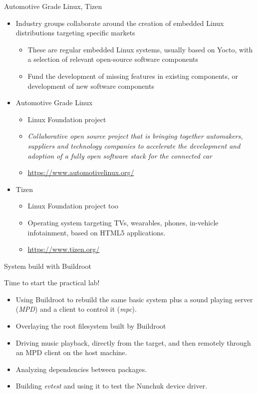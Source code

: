 \begin{frame}{Automotive Grade Linux, Tizen}
  \begin{itemize}
  \item Industry groups collaborate around the creation of embedded
    Linux distributions targeting specific markets
    \begin{itemize}
    \item These are regular embedded Linux systems, usually based on
      Yocto, with a selection of relevant open-source software components
    \item Fund the development of missing features in existing
      components, or development of new software components
    \end{itemize}
  \item Automotive Grade Linux
    \begin{itemize}
    \item Linux Foundation project
    \item {\em Collaborative open source project that is bringing
        together automakers, suppliers and technology companies to
        accelerate the development and adoption of a fully open
        software stack for the connected car}
    \item \url{https://www.automotivelinux.org/}
    \end{itemize}
  \item Tizen
    \begin{itemize}
    \item Linux Foundation project too
    \item Operating system targeting TVs, wearables, phones, in-vehicle
          infotainment, based on HTML5 applications.
    \item \url{https://www.tizen.org/}
    \end{itemize}
  \end{itemize}
\end{frame}

\setuplabframe
{System build with Buildroot}
{
  Time to start the practical lab!
  \begin{itemize}
  \item Using Buildroot to rebuild the same basic system plus a sound
    playing server ({\em MPD}) and a client to control it ({\em mpc}).
  \item Overlaying the root filesystem built by Buildroot
  \item Driving music playback, directly from the target, and then
    remotely through an MPD client on the host machine.
  \item Analyzing dependencies between packages.
  \item Building {\em evtest} and using it to test the Nunchuk
	device driver.
  \end{itemize}
}
